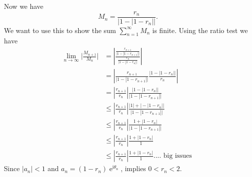 \documentclass[10pt]{amsart}
\newcommand{\I}{\mathrm{i}}
\DeclareMathOperator{\E}{e}
\theoremstyle{nonumberplain}
\begin{document}
\begin{enumerate}[label={\bf {\arabic*}:}]
\begin{itemize}
Now we have
$$ M_n = \frac{ r_n}{ \big| 1 - |1 - r_n|\big|}. $$
We want to use this to show the sum $ \sum_{n = 1}^\infty M_n $ is finite.
Using the ratio test we have
\begin{align*}
\lim_{n\rightarrow\infty} \Bigg| \frac {M_{n + 1}}{M_n} \Bigg|
	&= \left| \frac {\frac{ r_{n + 1}}{ \big| 1 - |1 - r_{n + 1}|\big|}}{\frac{ r_n}{ \big| 1 - |1 - r_n|\big|}} \right| \\
	&= \left|  \frac{ r_{n + 1}}{ \big| 1 - |1 - r_{n + 1}|\big|} \frac{ \big| 1 - |1 - r_n|\big|} { r_n}\right| \\
	&= \left|  \frac{ r_{n + 1}}{ r_n} \right| \frac{ \big| 1 - |1 - r_n|\big|}{ \big| 1 - |1 - r_{n + 1}|\big|} \\
	&\leq \left|  \frac{ r_{n + 1}}{ r_n} \right| \frac{|1| + \big|- |1 - r_n|\big|}{ \big| 1 - |1 - r_{n + 1}|\big|} \\
	&\leq \left|  \frac{ r_{n + 1}}{ r_n} \right| \frac{1 + |1 - r_n|}{ \big| 1 - |1 - r_{n + 1}|\big|} \\
	&\leq \left|  \frac{ r_{n + 1}}{ r_n} \right| \frac{1 + |1 - r_n|}{1} \\
	&\leq \left|  \frac{ r_{n + 1}}{ r_n} \right| \frac{1 + |1 - r_n|}{1} ....\text{ big issues }
\end{align*}
Since $|a_n| < 1$ and $a_n = (1 - r_n)\E^{\I \theta_n}$, implies $0 < r_n < 2$.


\end{itemize}
\end{enumerate}
\end{document}
